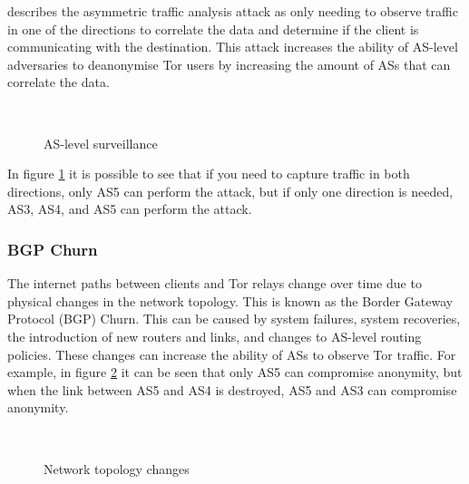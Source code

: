 \documentclass[9pt,technote]{IEEEtran}
\begin{document}
\citeauthor{sun2015raptor} describes the asymmetric traffic analysis attack as only needing to observe traffic in one of the directions to correlate the data and determine if the client is communicating with the destination. This attack increases the ability of AS-level adversaries to deanonymise Tor users by increasing the amount of ASs that can correlate the data.\\

\begin{figure}[h!]
\centering
{}
~~
\caption{AS-level surveillance \cite{sun2015raptor}}
\label{fig:as-routing}
\end{figure}

In figure \ref{fig:as-routing} it is possible to see that if you need to capture traffic in both directions, only AS5 can perform the attack, but if only one direction is needed, AS3, AS4, and AS5 can perform the attack.\\

\subsubsection{BGP Churn}
The internet paths between clients and Tor relays change over time due to
physical changes in the network topology. This is known as the Border Gateway Protocol (BGP) Churn. This can be caused by system failures, system recoveries, the introduction of new routers and links, and changes to AS-level routing policies. These changes can increase the ability of ASs to observe Tor traffic. For example, in figure \ref{fig:as-churn} it can be seen that only AS5 can compromise anonymity, but when the link between AS5 and AS4 is destroyed, AS5 and AS3 can compromise anonymity.\\

\begin{figure}[h!]
\centering
{}
~~
\caption{Network topology changes \cite{sun2015raptor}}
\label{fig:as-churn}
\end{figure}
\end{document}
